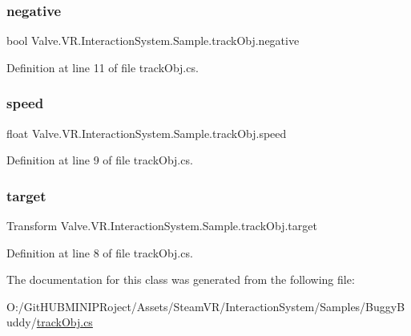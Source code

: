\subsubsection{\texorpdfstring{negative}{negative}}
{\footnotesize\ttfamily bool Valve.\+V\+R.\+Interaction\+System.\+Sample.\+track\+Obj.\+negative}



Definition at line 11 of file track\+Obj.\+cs.

\mbox{\label{class_valve_1_1_v_r_1_1_interaction_system_1_1_sample_1_1track_obj_aa30e41c109c0185c86ba76029ea1cb0f}} 
\subsubsection{\texorpdfstring{speed}{speed}}
{\footnotesize\ttfamily float Valve.\+V\+R.\+Interaction\+System.\+Sample.\+track\+Obj.\+speed}



Definition at line 9 of file track\+Obj.\+cs.

\mbox{\label{class_valve_1_1_v_r_1_1_interaction_system_1_1_sample_1_1track_obj_a3edc57cc2c2e60505a534752ea3dadc8}} 
\subsubsection{\texorpdfstring{target}{target}}
{\footnotesize\ttfamily Transform Valve.\+V\+R.\+Interaction\+System.\+Sample.\+track\+Obj.\+target}



Definition at line 8 of file track\+Obj.\+cs.



The documentation for this class was generated from the following file\+:\begin{DoxyCompactItemize}
\item 
O\+:/\+Git\+H\+U\+B\+M\+I\+N\+I\+P\+Roject/\+Assets/\+Steam\+V\+R/\+Interaction\+System/\+Samples/\+Buggy\+Buddy/\mbox{\hyperlink{track_obj_8cs}{track\+Obj.\+cs}}\end{DoxyCompactItemize}
